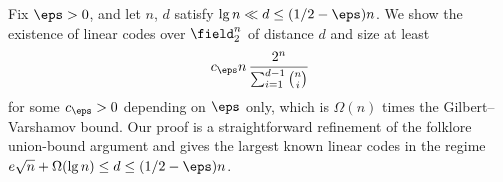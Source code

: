 \renewenvironment{abstract}{\small \list{}{%
    \setlength{\leftmargin}{10mm}%
    \setlength{\rightmargin}{\leftmargin}%
    \listparindent 0em%
  }\item{}}{\endlist}

\begin{abstract}
Fix $\eps>0$, and let $n$, $d$ satisfy
$\lg n\ll d\le (1/2-\eps)n$. We show the existence of linear
codes over $\field_2^n$ of distance $d$ and size at least
$$
c_\eps n\,\frac{2^n}{\sum_{i=1}^{d-1}\binom ni}
$$
for some $c_\eps>0$ depending on $\eps$ only, which is
$\Omega(n)$ times the Gilbert--Varshamov bound. Our proof is
a straightforward refinement of the folklore union-bound
argument and gives the largest known linear codes in the
regime $e\sqrt{n}+\Omega(\lg n) \le d \le (1/2-\eps)n$.
\end{abstract}



